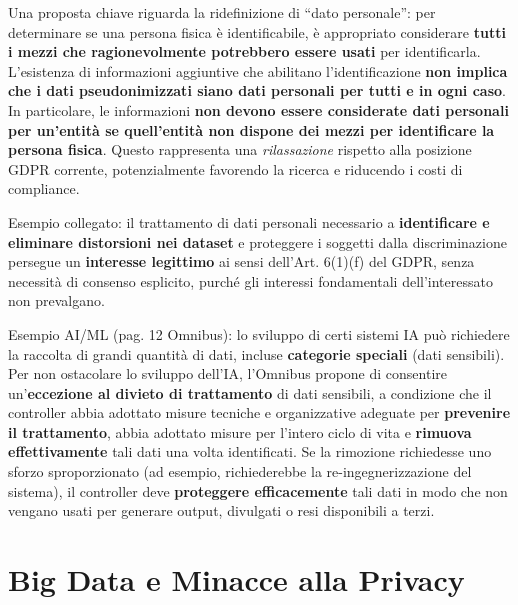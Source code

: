 \documentclass[a4paper,11pt]{article}
\begin{document}
\begin{nota}
Una proposta chiave riguarda la ridefinizione di ``dato personale'': per determinare se una persona fisica \`{e} identificabile, \`{e} appropriato considerare \textbf{tutti i mezzi che ragionevolmente potrebbero essere usati} per identificarla. L'esistenza di informazioni aggiuntive che abilitano l'identificazione \textbf{non implica che i dati pseudonimizzati siano dati personali per tutti e in ogni caso}. In particolare, le informazioni \textbf{non devono essere considerate dati personali per un'entit\`{a} se quell'entit\`{a} non dispone dei mezzi per identificare la persona fisica}. Questo rappresenta una \emph{rilassazione} rispetto alla posizione GDPR corrente, potenzialmente favorendo la ricerca e riducendo i costi di compliance.

Esempio collegato: il trattamento di dati personali necessario a \textbf{identificare e eliminare distorsioni nei dataset} e proteggere i soggetti dalla discriminazione persegue un \textbf{interesse legittimo} ai sensi dell'Art. 6(1)(f) del GDPR, senza necessit\`{a} di consenso esplicito, purch\'{e} gli interessi fondamentali dell'interessato non prevalgano.

Esempio AI/ML (pag. 12 Omnibus): lo sviluppo di certi sistemi IA pu\`{o} richiedere la raccolta di grandi quantit\`{a} di dati, incluse \textbf{categorie speciali} (dati sensibili). Per non ostacolare lo sviluppo dell'IA, l'Omnibus propone di consentire un'\textbf{eccezione al divieto di trattamento} di dati sensibili, a condizione che il controller abbia adottato misure tecniche e organizzative adeguate per \textbf{prevenire il trattamento}, abbia adottato misure per l'intero ciclo di vita e \textbf{rimuova effettivamente} tali dati una volta identificati. Se la rimozione richiedesse uno sforzo sproporzionato (ad esempio, richiederebbe la re-ingegnerizzazione del sistema), il controller deve \textbf{proteggere efficacemente} tali dati in modo che non vengano usati per generare output, divulgati o resi disponibili a terzi.
\end{nota}

\section{Big Data e Minacce alla Privacy}
\end{document}
